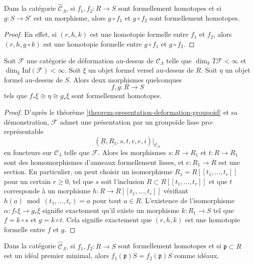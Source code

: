 \begin{lemma}
\label{lemma-composition-homotopic}
Dans la catégorie $\widehat{\mathcal{C}}_\Lambda$, si
$f_1, f_2 : R \to S$ sont formellement homotopes et si $g : S \to S'$ est un
morphisme, alors $g \circ f_1$ et $g \circ f_2$ sont formellement homotopes.
\end{lemma}

\begin{proof}
En effet, si $(r, h, k)$ est une homotopie formelle entre $f_1$ et $f_2$,
alors $(r, h, g \circ k)$ est une homotopie formelle entre $g \circ f_1$ et
$g \circ f_2$.
\end{proof}

\begin{lemma}
\label{lemma-versal-unique-up-to-homotopy}
Soit $\mathcal{F}$ une catégorie de déformation au-dessus de
$\mathcal{C}_\Lambda$ telle que $\dim_k T\mathcal{F} < \infty$ et
$\dim_k \text{Inf}(\mathcal{F}) < \infty$. Soit $\xi$ un objet formel versel
au-dessus de $R$. Soit $\eta$ un objet formel au-dessus de $S$. Alors deux
morphismes quelconques
$$
f, g : R \to S
$$
tels que $f_*\xi \cong \eta \cong g_*\xi$ sont formellement homotopes.
\end{lemma}

\begin{proof}
D'après le théorème \ref{theorem-presentation-deformation-groupoid} et sa
démonstration, $\mathcal{F}$ admet une présentation par un groupoïde lisse
pro-représentable
$$
(\underline{R}, \underline{R_1}, s, t, c, e, i)|_{\mathcal{C}_\Lambda}
$$
en foncteurs sur $\mathcal{C}_\lambda$ telle que $\mathcal{F}$. Alors les
morphismes $s : R \to R_1$ et $t : R \to R_1$ sont des homomorphismes
d'anneaux formellement lisses, et $e : R_1 \to R$ est une section. En
particulier, on peut choisir un isomorphisme
$R_1 = R[[t_1, \ldots, t_r]]$ pour un certain $r \geq 0$, tel que $s$ soit
l'inclusion $R \subset R[[t_1, \ldots, t_r]]$ et que $t$ corresponde à un
morphisme $h : R \to R[[t_1, \ldots, t_r]]$ vérifiant
$h(a) \bmod (t_1, \ldots, t_r) = a$ pour tout $a \in R$. L'existence de
l'isomorphisme $\alpha : f_*\xi \to g_*\xi$ signifie exactement qu'il existe
un morphisme $k : R_1 \to S$ tel que $f = k \circ s$ et $g = k \circ t$.
Cela signifie exactement que $(r, h, k)$ est une homotopie formelle entre $f$
et $g$.
\end{proof}

\begin{lemma}
\label{lemma-homotopic-minimal-prime}
Dans la catégorie $\widehat{\mathcal{C}}_\Lambda$, si
$f_1, f_2 : R \to S$ sont formellement homotopes et si
$\mathfrak p \subset R$ est un idéal premier minimal, alors
$f_1(\mathfrak p)S = f_2(\mathfrak p)S$ comme idéaux.
\end{lemma}

